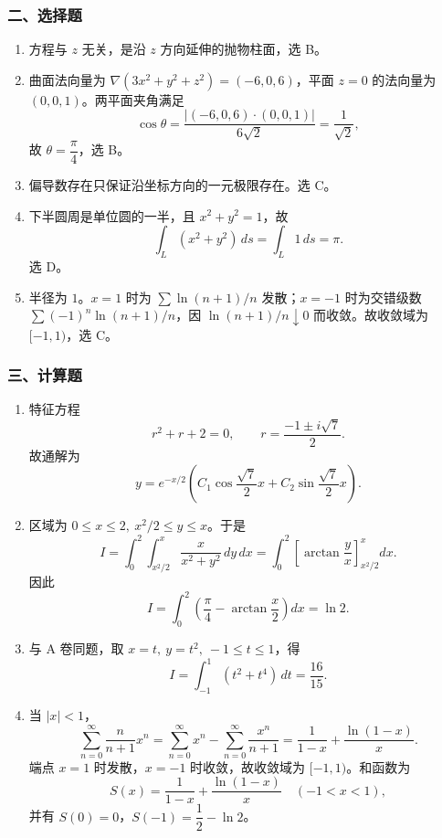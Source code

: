 \subsubsection*{二、选择题}
\begin{enumerate}
  \item 方程与 $z$ 无关，是沿 $z$ 方向延伸的抛物柱面，选 B。
  \item 曲面法向量为 $\nabla(3x^2+y^2+z^2)=(-6,0,6)$，平面 $z=0$ 的法向量为 $(0,0,1)$。两平面夹角满足
  \[
  \cos\theta=\frac{|(-6,0,6)\cdot(0,0,1)|}{6\sqrt2}=\frac1{\sqrt2},
  \]
  故 $\theta=\dfrac{\pi}{4}$，选 B。
  \item 偏导数存在只保证沿坐标方向的一元极限存在。选 C。
  \item 下半圆周是单位圆的一半，且 $x^2+y^2=1$，故
  \[
  \int_L(x^2+y^2)\,ds=\int_L1\,ds=\pi.
  \]
  选 D。
  \item 半径为 $1$。$x=1$ 时为 $\sum\ln(n+1)/n$ 发散；$x=-1$ 时为交错级数 $\sum(-1)^n\ln(n+1)/n$，因 $\ln(n+1)/n\downarrow0$ 而收敛。故收敛域为 $[-1,1)$，选 C。
\end{enumerate}

\subsubsection*{三、计算题}
\begin{enumerate}
  \item 特征方程
  \[
  r^2+r+2=0,\qquad r=\frac{-1\pm i\sqrt7}{2}.
  \]
  故通解为
  \[
  y=e^{-x/2}\left(C_1\cos\frac{\sqrt7}{2}x+C_2\sin\frac{\sqrt7}{2}x\right).
  \]
  \item 区域为 $0\le x\le2,\ x^2/2\le y\le x$。于是
  \[
  I=\int_0^2\int_{x^2/2}^{x}\frac{x}{x^2+y^2}\,dy\,dx
  =\int_0^2\left[\arctan\frac{y}{x}\right]_{x^2/2}^{x}dx.
  \]
  因此
  \[
  I=\int_0^2\left(\frac{\pi}{4}-\arctan\frac{x}{2}\right)dx
  =\ln2.
  \]
  \item 与 A 卷同题，取 $x=t,\ y=t^2,\ -1\le t\le1$，得
  \[
  I=\int_{-1}^{1}(t^2+t^4)\,dt=\frac{16}{15}.
  \]
  \item 当 $|x|<1$，
  \[
  \sum_{n=0}^{\infty}\frac{n}{n+1}x^n
  =\sum_{n=0}^{\infty}x^n-\sum_{n=0}^{\infty}\frac{x^n}{n+1}
  =\frac1{1-x}+\frac{\ln(1-x)}{x}.
  \]
  端点 $x=1$ 时发散，$x=-1$ 时收敛，故收敛域为 $[-1,1)$。和函数为
  \[
  S(x)=\frac1{1-x}+\frac{\ln(1-x)}{x}\quad(-1<x<1),
  \]
  并有 $S(0)=0$，$S(-1)=\dfrac12-\ln2$。
\end{enumerate}

